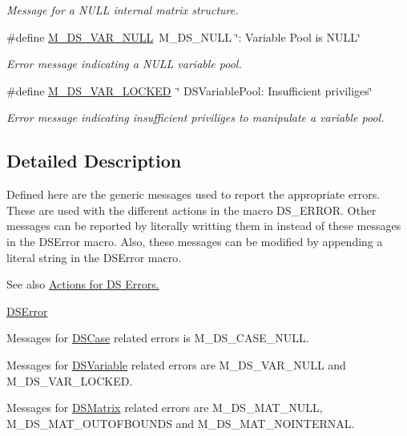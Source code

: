 \begin{DoxyCompactItemize}
\begin{DoxyCompactList}\small\item\em Message for a NULL internal matrix structure. \item\end{DoxyCompactList}\item 
\hypertarget{group___m___d_s___messages_gac31f10e693824b630ea7bd80f59acadf}{
\#define \hyperlink{group___m___d_s___messages_gac31f10e693824b630ea7bd80f59acadf}{M\_\-DS\_\-VAR\_\-NULL}~M\_\-DS\_\-NULL \char`\"{}: Variable Pool is NULL\char`\"{}}
\label{group___m___d_s___messages_gac31f10e693824b630ea7bd80f59acadf}

\begin{DoxyCompactList}\small\item\em Error message indicating a NULL variable pool. \item\end{DoxyCompactList}\item 
\hypertarget{group___m___d_s___messages_gaa3430366ad7beeafb53737b0174c5a0b}{
\#define \hyperlink{group___m___d_s___messages_gaa3430366ad7beeafb53737b0174c5a0b}{M\_\-DS\_\-VAR\_\-LOCKED}~\char`\"{} DSVariablePool: Insufficient priviliges\char`\"{}}
\label{group___m___d_s___messages_gaa3430366ad7beeafb53737b0174c5a0b}

\begin{DoxyCompactList}\small\item\em Error message indicating insufficient priviliges to manipulate a variable pool. \item\end{DoxyCompactList}\end{DoxyCompactItemize}


\subsection{Detailed Description}
Defined here are the generic messages used to report the appropriate errors. These are used with the different actions in the macro DS\_\-ERROR. Other messages can be reported by literally writting them in instead of these messages in the DSError macro. Also, these messages can be modified by appending a literal string in the DSError macro.

\begin{DoxySeeAlso}{See also}
\hyperlink{group___a___d_s___actions}{Actions for DS Errors.} 

\hyperlink{_d_s_errors_8h_a09b28eb2b01986855910ca97dfe91144}{DSError}
\end{DoxySeeAlso}
Messages for \hyperlink{struct_d_s_case}{DSCase} related errors is M\_\-DS\_\-CASE\_\-NULL.

Messages for \hyperlink{struct_d_s_variable}{DSVariable} related errors are M\_\-DS\_\-VAR\_\-NULL and M\_\-DS\_\-VAR\_\-LOCKED.

Messages for \hyperlink{struct_d_s_matrix}{DSMatrix} related errors are M\_\-DS\_\-MAT\_\-NULL, M\_\-DS\_\-MAT\_\-OUTOFBOUNDS and M\_\-DS\_\-MAT\_\-NOINTERNAL. 